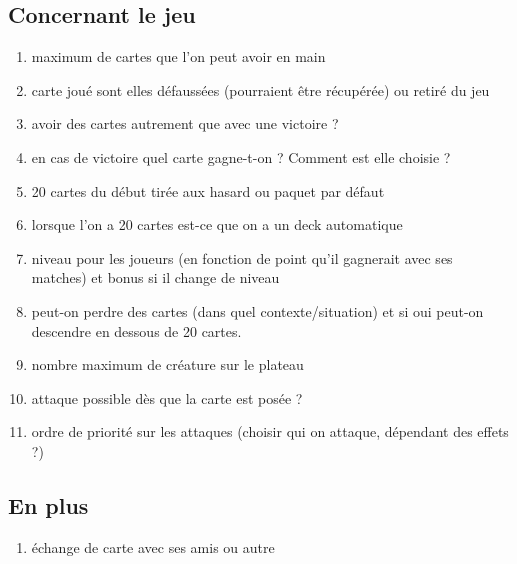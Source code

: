 \documentclass[11pt]{article}
\begin{document}
  \subsection{Concernant le jeu}
    \begin{enumerate}
    \item maximum de cartes que l'on peut avoir en main
    \item carte joué sont elles défaussées (pourraient être récupérée) ou retiré du jeu
    \item avoir des cartes autrement que avec une victoire ?
    \item en cas de victoire quel carte gagne-t-on ?  Comment est elle choisie ?
    \item 20 cartes du début tirée aux hasard ou paquet par défaut
    \item lorsque l'on a 20 cartes est-ce que on a un deck automatique
    \item niveau pour les joueurs (en fonction de point qu'il gagnerait avec ses matches) et bonus si il change de niveau
    \item peut-on perdre des cartes (dans quel contexte/situation) et si oui peut-on descendre en dessous de 20 cartes.
    \item nombre maximum de créature sur le plateau
    \item attaque possible dès que la carte est posée ?
    \item ordre de priorité sur les attaques (choisir qui on attaque, dépendant des effets ?)
    \end{enumerate}
    
  \subsection{En plus}
    \begin{enumerate}
    \item échange de carte avec ses amis ou autre
    \end{enumerate}
\end{document}
